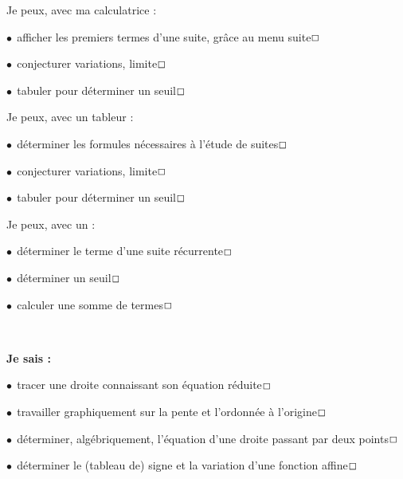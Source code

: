 \documentclass[a4paper,11pt]{article}
\begin{document}
\begin{ccalco}
\selectfont\small
Je peux, avec ma calculatrice :

\tabula{}$\bullet~~$afficher les premiers termes d'une suite, grâce au menu suite\dotfill{}$\Large\Box$

\tabula{}$\bullet~~$conjecturer variations, limite\dotfill{}$\Large\Box$

\tabula{}$\bullet~~$tabuler pour déterminer un seuil\dotfill{}$\Large\Box$
\end{ccalco}

\begin{coutil}
\selectfont\small
Je peux, avec un tableur :

\tabula{}$\bullet~~$déterminer les formules nécessaires à l'étude de suites\dotfill{}$\Large\Box$

\tabula{}$\bullet~~$conjecturer variations, limite\dotfill{}$\Large\Box$

\tabula{}$\bullet~~$tabuler pour déterminer un seuil\dotfill{}$\Large\Box$
\end{coutil}

\begin{calgo}
\selectfont\small
Je peux, avec un  :

\tabula{}$\bullet~~$déterminer le terme d'une suite récurrente\dotfill{}$\Large\Box$

\tabula{}$\bullet~~$déterminer un seuil\dotfill{}$\Large\Box$

\tabula{}$\bullet~~$calculer une somme de termes\dotfill{}$\Large\Box$
\end{calgo}

\pagebreak

\color{titrebleu}\,\hrulefill\,

\begin{casavoir}
\selectfont\small
\textbf{Je sais :}

\tabula{}$\bullet~~$tracer une droite connaissant son équation réduite\dotfill{}$\Large\Box$

\tabula{}$\bullet~~$travailler graphiquement sur la pente et l'ordonnée à l'origine\dotfill{}$\Large\Box$

\tabula{}$\bullet~~$déterminer, algébriquement, l'équation d'une droite passant par deux points\dotfill{}$\Large\Box$

\tabula{}$\bullet~~$déterminer le (tableau de) signe et la variation d'une fonction affine\dotfill{}$\Large\Box$
\end{casavoir}
\end{document}
